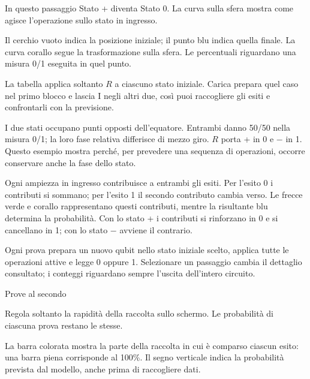 In questo passaggio Stato + diventa Stato 0. La curva sulla sfera mostra come agisce l'operazione sullo stato in ingresso.\par

Il cerchio vuoto indica la posizione iniziale; il punto blu indica quella finale. La curva corallo segue la trasformazione sulla sfera. Le percentuali riguardano una misura 0/1 eseguita in quel punto.\par

La tabella applica soltanto \(R\) a ciascuno stato iniziale. \guillemotleft{}Carica\guillemotright{} prepara quel caso nel primo blocco e lascia I negli altri due, così puoi raccogliere gli esiti e confrontarli con la previsione.\par

I due stati occupano punti opposti dell'equatore. Entrambi danno 50/50 nella misura 0/1; la loro fase relativa differisce di mezzo giro. \(R\) porta + in 0 e \(- \) in 1. Questo esempio mostra perché, per prevedere una sequenza di operazioni, occorre conservare anche la fase dello stato.\par

Ogni ampiezza in ingresso contribuisce a entrambi gli esiti. Per l'esito 0 i contributi si sommano; per l'esito 1 il secondo contributo cambia verso. Le frecce verde e corallo rappresentano questi contributi, mentre la risultante blu determina la probabilità. Con lo stato + i contributi si rinforzano in 0 e si cancellano in 1; con lo stato \(- \) avviene il contrario.\par

Ogni prova prepara un nuovo qubit nello stato iniziale scelto, applica tutte le operazioni attive e legge 0 oppure 1. Selezionare un passaggio cambia il dettaglio consultato; i conteggi riguardano sempre l'uscita dell'intero circuito.\par

Prove al secondo\par

Regola soltanto la rapidità della raccolta sullo schermo. Le probabilità di ciascuna prova restano le stesse.\par

La barra colorata mostra la parte della raccolta in cui è comparso ciascun esito: una barra piena corrisponde al 100\%. Il segno verticale indica la probabilità prevista dal modello, anche prima di raccogliere dati.\par

